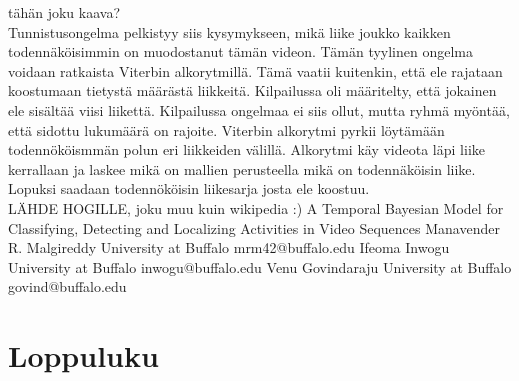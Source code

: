 tähän joku kaava? \\
Tunnistusongelma pelkistyy siis kysymykseen, mikä liike joukko kaikken todennäköisimmin on muodostanut tämän videon.
Tämän tyylinen ongelma voidaan ratkaista Viterbin alkorytmillä. Tämä vaatii kuitenkin, että ele rajataan koostumaan tietystä määrästä liikkeitä.
Kilpailussa oli määritelty, että jokainen ele sisältää viisi liikettä. Kilpailussa ongelmaa ei siis ollut, mutta ryhmä myöntää, että sidottu lukumäärä on rajoite.
Viterbin alkorytmi pyrkii löytämään todennököismmän polun eri liikkeiden välillä. Alkorytmi käy videota läpi liike kerrallaan ja laskee mikä
on mallien perusteella mikä on todennäköisin liike. Lopuksi saadaan todennököisin liikesarja josta ele koostuu.\\

LÄHDE HOGILLE, joku muu kuin wikipedia :)
A Temporal Bayesian Model for Classifying, Detecting and Localizing Activities
in Video Sequences
Manavender R. Malgireddy
University at Buffalo
mrm42@buffalo.edu
Ifeoma Inwogu
University at Buffalo
inwogu@buffalo.edu
Venu Govindaraju
University at Buffalo
govind@buffalo.edu

\section{Loppuluku}




